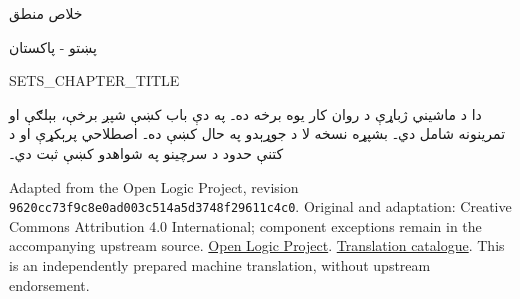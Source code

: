 \documentclass[12pt,a4paper]{article}
\begin{document}
\setRTL
\begin{center}
{\Huge خلاص منطق}\par
{\Large پښتو - پاکستان}\par\medskip
{\LARGE SETS_CHAPTER_TITLE}\par\medskip
\end{center}
دا د ماشيني ژباړې د روان کار يوه برخه ده۔ په دې باب کښې شپږ برخې، بېلګې او تمرينونه شامل دي۔ بشپړه نسخه لا د جوړېدو په حال کښې ده۔ اصطلاحي پرېکړې او د کتنې حدود د سرچينو په شواهدو کښې ثبت دي۔
\begin{LTR}\latinfont\small
Adapted from the Open Logic Project, revision
\texttt{9620cc73f9c8e0ad003c514a5d3748f29611c4c0}.
Original and adaptation: Creative Commons Attribution 4.0 International;
component exceptions remain in the accompanying upstream source.
\href{https://openlogicproject.org/}{Open Logic Project}.
\href{https://github.com/KokunoYumeto/OpenLogic-translations}{Translation catalogue}.
This is an independently prepared machine translation, without upstream endorsement.
\end{LTR}
\bigskip
\end{document}
